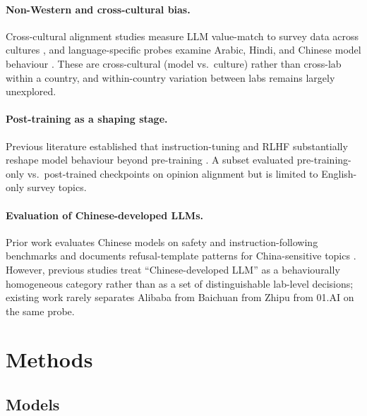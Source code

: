 \documentclass[letterpaper]{article} %
\begin{document}
\paragraph{Non-Western and cross-cultural bias.} Cross-cultural alignment studies measure LLM value-match to survey data across cultures \citep{tao2024cultural,durmus2024globalopinionqa}, and language-specific probes examine Arabic, Hindi, and Chinese model behaviour \citep{naous2024beer,cao2023assessing}. These are cross-cultural (model vs.\ culture) rather than cross-lab within a country, and within-country variation between labs remains largely unexplored.

\paragraph{Post-training as a shaping stage.} Previous literature established that instruction-tuning and RLHF substantially reshape model behaviour beyond pre-training \citep{ouyang2022instructgpt,bai2022training,casper2023open}. A subset evaluated pre-training-only vs.\ post-trained checkpoints on opinion alignment \citep{durmus2024globalopinionqa} but is limited to English-only survey topics.

\paragraph{Evaluation of Chinese-developed LLMs.} Prior work evaluates Chinese models on safety and instruction-following benchmarks \citep{zhang2024safetybench,xu2023align} and documents refusal-template patterns for China-sensitive topics \citep{wang2024decodingtrust,deshpande2023toxicity}. However, previous studies treat ``Chinese-developed LLM'' as a behaviourally homogeneous category rather than as a set of distinguishable lab-level decisions; existing work rarely separates Alibaba from Baichuan from Zhipu from 01.AI on the same probe.

\section{Methods}

\subsection{Models}
\end{document}
